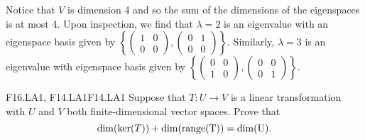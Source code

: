 \documentclass[../../AlgebraQualSolutions.tex]{subfiles}
\begin{document}
	\begin{solution}
		Notice that $V$ is dimension 4 and so the sum of the dimensions  of the eigenspaces is at most 4. Upon inspection, we find that $\lambda = 2$ is an eigenvalue with an eigenspace basis given by $\left\{ \begin{pmatrix} 1 & 0 \\ 0 & 0 \end{pmatrix}, \begin{pmatrix} 0 & 1 \\ 0 & 0 \end{pmatrix} \right\}$. Similarly, $\lambda = 3$ is an eigenvalue with eigenspace basis given by $\left\{ \begin{pmatrix} 0 & 0 \\ 1 & 0 \end{pmatrix}, \begin{pmatrix} 0 & 0 \\ 0 & 1 \end{pmatrix} \right\}$. 
	\end{solution}

	\begin{prob}{F16.LA1, F14.LA1}{F14.LA1}
		Suppose that $T: U \to V$ is a linear transformation with $U$ and $V$ both finite-dimensional vector spaces. Prove that
			\[\dim(\ker(T)) + \dim(\rm{range}(T)) = \dim(U).\]
	\end{prob}
\end{document}

